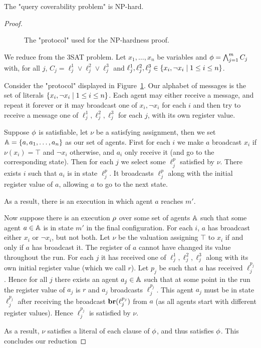 \begin{proposition}
	\label{prop:np-hard-query-cover}
	The "query coverability problem" is NP-hard.
\end{proposition}

\ifproofs
\begin{proof}
	\begin{figure}[h]
		
		\caption{The "protocol" used for the NP-hardness proof.}
		\label{fig:np-hard}
	\end{figure}
	
	We reduce from the 3SAT problem.
	Let $x_1, \ldots, x_n$ be variables and $\phi = \bigwedge_{j=1}^m C_j$ with, for all $j$, $C_j = \ell_j^1 \lor \ell_j^2 \lor \ell_j^3$ and $\ell_j^1, \ell_j^2, \ell_j^3 \in \{x_i, \neg x_i \mid 1 \leq i \leq n\}$. 

	Consider the "protocol" displayed in Figure~\ref{fig:np-hard}.
	Our alphabet of messages is the set of literals $\{x_i, \neg x_i \mid 1 \leq i \leq n\}$.
	Each agent may either receive a message, and repeat it forever or it may broadcast one of $x_i, \neg x_i$ for each $i$ and then try to receive a message one of $\ell_j^1, \ell_j^2, \ell_j^3$ for each $j$, with its own register value.
	
	Suppose $\phi$ is satisfiable, let $\nu$ be a satisfying assignment, then we set $\mathbb{A} = \{a, a_1, \ldots, a_n\}$ as our set of agents. First for each $i$ we make $a$ broadcast $x_i$ if $\nu(x_i)= \top$ and $\neg x_i$ otherwise, and $a_i$ only receive it (and go to the corresponding state).
	Then for each $j$ we select some $\ell_j^p$ satisfied by $\nu$. There exists $i$ such that $a_i$ is in state $\ell_j^p$. It broadcasts $\ell_j^p$ along with the initial register value of $a$, allowing $a$ to go to the next state.
	
	As a result, there is an execution in which agent $a$ reaches $m'$.
	
	Now suppose there is an execution $\rho$ over some set of agents $\mathbb{A}$ such that some agent $a \in \mathbb{A}$ is in state $m'$ in the final configuration.
	For each $i$, $a$ has broadcast either $x_i$ or $\neg x_i$, but not both.
	Let $\nu$ be the valuation assigning $\top$ to $x_i$ if and only if $a$ has broadcast it.
	The register of $a$ cannot have changed its value throughout the run. 
	For each $j$ it has received one of $\ell_j^1, \ell_j^2, \ell_j^3$ along with its own initial register value (which we call $r$). Let $p_j$ be such that $a$ has received $\ell_j^{p_j}$.
	Hence for all $j$ there exists an agent $a_j \in \mathbb{A}$ such that at some point in the run the register value of $a_j$ is $r$ and $a_j$ broadcasts $\ell_j^{p_j}$.
	This agent $a_j$ must be in state $\ell_j^{p_j}$ after receiving the broadcast $\textbf{br}(\ell_j^{p_j})$ from $a$ (as all agents start with different register values).
	Hence $\ell_j^{p_j}$ is satisfied by $\nu$. 
	
	As a result, $\nu$ satisfies a literal of each clause of $\phi$, and thus satisfies $\phi$. This concludes our reduction
\end{proof}
\fi